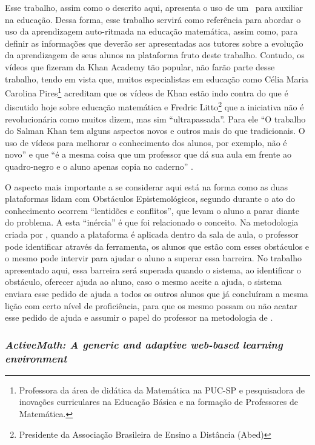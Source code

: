 Esse trabalho, assim como o descrito aqui, apresenta o uso de um \SystemType~para auxiliar na educação. Dessa forma, esse trabalho servirá como referência para abordar o uso da aprendizagem auto-ritmada na educação matemática, assim como, para definir as informações que deverão ser apresentadas aos tutores sobre a evolução da aprendizagem de seus alunos na plataforma fruto deste trabalho. Contudo, os vídeos que fizeram da Khan Academy tão popular, não farão parte desse trabalho, tendo em vista que, muitos especialistas em educação como Célia Maria Carolina Pires\footnote{Professora da área de didática da Matemática na PUC-SP e pesquisadora de inovações curriculares na Educação Básica e na formação de Professores de Matemática.} acreditam que os vídeos de Khan estão indo contra do que é discutido hoje sobre educação matemática \cite{cartacapital2013} e Fredric Litto\footnote{Presidente da Associação Brasileira de Ensino a Distância (Abed)} que a iniciativa não é revolucionária como muitos dizem, mas sim ``ultrapassada''. Para ele ``O trabalho do Salman Khan tem alguns aspectos novos e outros mais do que tradicionais. O uso de vídeos para melhorar o conhecimento dos alunos, por exemplo, não é novo'' e que ``é a mesma coisa que um professor que dá sua aula em frente ao quadro-negro e o aluno apenas copia no caderno'' \cite{revistaeducacao2013}.

O aspecto mais importante a se considerar aqui está na forma como as duas plataformas lidam com Obstáculos Epistemológicos, segundo  durante o ato do conhecimento ocorrem ``lentidões e conflitos'', que levam o aluno a parar diante do problema. A esta ``inércia'' é que foi relacionado o conceito. Na metodologia criada por , quando a plataforma é aplicada dentro da sala de aula, o professor pode identificar através da ferramenta, os alunos que estão com esses obstáculos e o mesmo pode intervir para ajudar o aluno a superar essa barreira. No trabalho apresentado aqui, essa barreira será superada quando o sistema, ao identificar o obstáculo, oferecer ajuda ao aluno, caso o mesmo aceite a ajuda, o sistema enviara esse pedido de ajuda a todos os outros alunos que já concluíram a mesma lição com certo nível de proficiência, para que os mesmo possam ou não acatar esse pedido de ajuda e assumir o papel do professor na metodologia de . 


\subsubsection{\textit{ActiveMath: A generic and adaptive web-based learning environment}}

